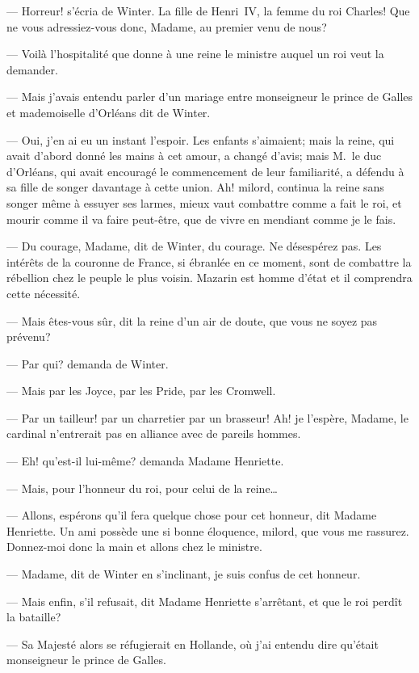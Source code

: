 — Horreur! s'écria de Winter. La fille de Henri~IV, la femme du roi Charles! Que ne vous adressiez-vous donc, Madame, au premier venu de nous?

— Voilà l'hospitalité que donne à une reine le ministre auquel un roi veut la demander.

— Mais j'avais entendu parler d'un mariage entre monseigneur le prince de Galles et mademoiselle d'Orléans dit de Winter.

— Oui, j'en ai eu un instant l'espoir. Les enfants s'aimaient; mais la reine, qui avait d'abord donné les mains à cet amour, a changé d'avis; mais M.~le duc d'Orléans, qui avait encouragé le commencement de leur familiarité, a défendu à sa fille de songer davantage à cette union. Ah! milord, continua la reine sans songer même à essuyer ses larmes, mieux vaut combattre comme a fait le roi, et mourir comme il va faire peut-être, que de vivre en mendiant comme je le fais.

— Du courage, Madame, dit de Winter, du courage. Ne désespérez pas. Les intérêts de la couronne de France, si ébranlée en ce moment, sont de combattre la rébellion chez le peuple le plus voisin. Mazarin est homme d'état et il comprendra cette nécessité.

— Mais êtes-vous sûr, dit la reine d'un air de doute, que vous ne soyez pas prévenu?

— Par qui? demanda de Winter.

— Mais par les Joyce, par les Pride, par les Cromwell.

— Par un tailleur! par un charretier par un brasseur! Ah! je l'espère, Madame, le cardinal n'entrerait pas en alliance avec de pareils hommes.

— Eh! qu'est-il lui-même? demanda Madame Henriette.

— Mais, pour l'honneur du roi, pour celui de la reine\dots

— Allons, espérons qu'il fera quelque chose pour cet honneur, dit Madame Henriette. Un ami possède une si bonne éloquence, milord, que vous me rassurez. Donnez-moi donc la main et allons chez le ministre.

— Madame, dit de Winter en s'inclinant, je suis confus de cet honneur.

— Mais enfin, s'il refusait, dit Madame Henriette s'arrêtant, et que le roi perdît la bataille?

— Sa Majesté alors se réfugierait en Hollande, où j'ai entendu dire qu'était monseigneur le prince de Galles.


